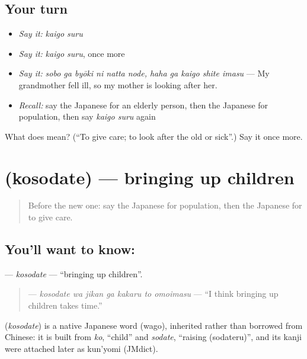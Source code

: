 \subsection*{Your turn}
\begin{itemize}
\raggedright
  \item \emph{Say it:} \emph{kaigo suru}
  \item \emph{Say it:} \emph{kaigo suru}, once more
  \item \emph{Say it:} \emph{sobo ga byōki ni natta node, haha ga kaigo shite imasu} — My grandmother fell ill, so my mother is looking after her.
  \item \emph{Recall:} say the Japanese for an elderly person, then the Japanese for population, then say \emph{kaigo suru} again
\end{itemize}

\begin{tcolorbox}[breakable,colback=teal!4,colframe=teal!35!black,title={Before you move on}]
What does  mean? (\textquotedblleft{}To give care; to look after the old or sick\textquotedblright{}.) Say it once more.
\end{tcolorbox}
\section[\texorpdfstring{\ja{こそだて} (kosodate)}{こそだて (kosodate)}]{ (kosodate) — bringing up children}

\label{lesson:JA-C333-kosodate}



\begin{quote}
Before the new one: say the Japanese for population, then the Japanese for to give care.
\end{quote}

\subsection*{You'll want to know: }
\textbf{} — \emph{kosodate} — \textquotedblleft{}bringing up children\textquotedblright{}.

\begin{quote}
\textbf{   } — \emph{kosodate wa jikan ga kakaru to omoimasu} — \textquotedblleft{}I think bringing up children takes time.\textquotedblright{}
\end{quote}

\begin{cousinweb}
\textbf{} (\emph{kosodate}) is a native Japanese word (wago), inherited rather than borrowed from Chinese: it is built from \emph{ko}, \textquotedblleft{}child\textquotedblright{} and \emph{sodate}, \textquotedblleft{}raising (sodateru)\textquotedblright{}, and its kanji were attached later as kun'yomi (JMdict).
\end{cousinweb}

